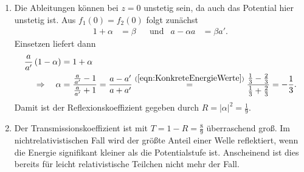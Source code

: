 \documentclass[german, parskip=full]{scrartcl}
\newcommand{\kla}{}
\newcommand{\tecxt}{}
\begin{document}
\begin{enumerate}
\begin{align*}
\end{align*}
\item[c)] Die Ableitungen können bei $z=0$ unstetig sein, da auch das Potential hier unstetig ist.
Aus $f_1(0)=f_2(0)$ folgt zunächst
\begin{align*}
1+\alpha&=\beta&&\tecxt\text{und}&a-\alpha a&=\beta a'.
\end{align*}
Einsetzen liefert dann
\begin{align*}
\frac{a}{a'}\kla\left( {1-\alpha} \right)&=1+\alpha\\
\Rightarrow\ \ \ \alpha &=\frac{\frac{a}{a'}-1}{\frac{a}{a'}+1}=\frac{a-a'}{a+a'}\overset{(\ref{eqn:KonkreteEnergieWerte})}{=}\frac{\frac{1}{3}-\frac{2}{3}}{\frac{1}{3}+\frac{2}{3}}=-\frac{1}{3}.
\end{align*}
Damit ist der Reflexionskoeffizient gegeben durch $R=|\alpha|^2=\frac{1}{9}$. 
\item[d)] Der Transmissionskoeffizient ist mit $T=1-R=\frac{8}{9}$ überraschend groß.
Im nichtrelativistischen Fall wird der größte Anteil einer Welle reflektiert, wenn die Energie signifikant kleiner als die Potentialstufe ist.
Anscheinend ist dies bereits für leicht relativistische Teilchen nicht mehr der Fall.
\end{enumerate}
\newpage
\end{document}

